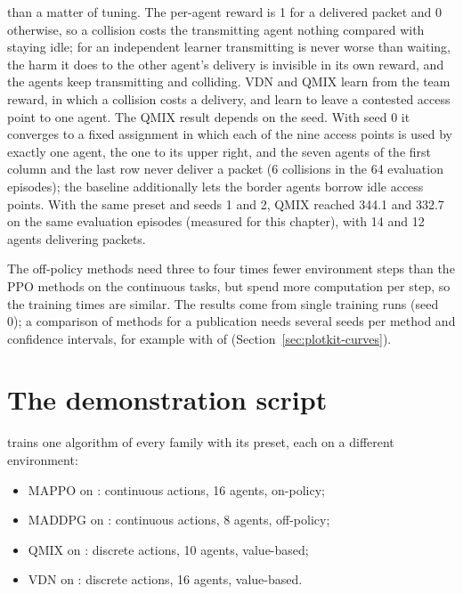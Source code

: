 \begin{itemize}
    than a matter of tuning. The per-agent reward is 1 for a delivered packet
    and 0 otherwise, so a collision costs the transmitting agent nothing
    compared with staying idle; for an independent learner transmitting is
    never worse than waiting, the harm it does to the other agent's delivery is
    invisible in its own reward, and the agents keep transmitting and
    colliding. VDN and QMIX learn from the team reward, in which a collision
    costs a delivery, and learn to leave a contested access point to one agent.
    The QMIX result depends on the seed. With seed 0 it converges to a fixed
    assignment in which each of the nine access points is used by exactly one
    agent, the one to its upper right, and the seven agents of the first column
    and the last row never deliver a packet (6 collisions in the 64 evaluation
    episodes); the baseline additionally lets the border agents borrow idle
    access points. With the same preset and seeds 1 and 2, QMIX reached 344.1
    and 332.7 on the same evaluation episodes (measured for this chapter),
    with 14 and 12 agents delivering packets.
\end{itemize}

The off-policy methods need three to four times fewer environment steps than the
PPO methods on the continuous tasks, but spend more computation per step, so
the training times are similar. The results come from single training runs
(seed 0); a comparison of methods for a publication needs several seeds per
method and confidence intervals, for example with
 of 
(Section~\ref{sec:plotkit-curves}).

\section{The demonstration script}\label{sec:marl-demo}

 trains one algorithm of every family
with its preset, each on a different environment:

\begin{itemize}
  \item MAPPO on : continuous actions, 16 agents, on-policy;
  \item MADDPG on : continuous actions, 8 agents, off-policy;
  \item QMIX on : discrete actions, 10 agents, value-based;
  \item VDN on : discrete actions, 16 agents, value-based.
\end{itemize}

